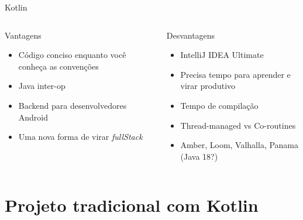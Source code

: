 \documentclass[aspectratio=169]{beamer}
\begin{document}
\begin{frame}{Kotlin}
\begin{columns}

	\begin{column}{0.5\textwidth}
		Vantagens
		\begin{itemize}
			\item Código conciso enquanto você conheça as convenções
			\item Java inter-op
			\item Backend para desenvolvedores Android
			\item Uma nova forma de virar \textit{fullStack}
		\end{itemize}
	\end{column}
	\begin{column}{0.5\textwidth}
		Desvantagens
		\begin{itemize}
			\item IntelliJ IDEA Ultimate
			\item Precisa tempo para aprender e virar produtivo
			\item Tempo de compilação
			\item Thread-managed vs Co-routines
			\item Amber, Loom, Valhalla, Panama (Java 18?)
		\end{itemize}
	\end{column}
\end{columns}
\end{frame}

{
    \section{Projeto tradicional com Kotlin}
}
\end{document}
